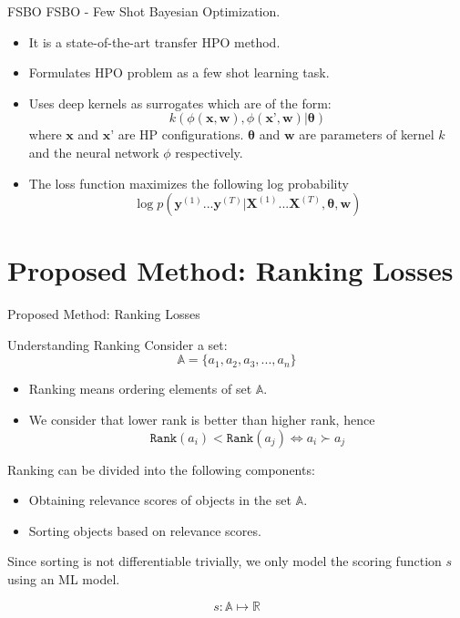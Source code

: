 \documentclass{beamer}
\begin{document}
\begin{frame}[t]{FSBO}
FSBO - Few Shot Bayesian Optimization.
\begin{itemize}
\item It is a state-of-the-art transfer HPO method.
\item Formulates HPO problem as a few shot learning task.
\item Uses deep kernels as surrogates which are of the form:
$$
k(\phi(\textbf{x}, \textbf{w})  ,   \phi(\textbf{x'}, \textbf{w}) |  \mathbf{\theta})
$$
where $\textbf{x}$ and $\textbf{x'}$ are HP configurations. $\mathbf{\theta}$ and $\textbf{w}$ are parameters of kernel $k$ and the neural network $\phi$ respectively.

\item The loss function maximizes the following log probability
$$
\log p( \textbf{y}^{(1)}...\textbf{y}^{(T)} | \textbf{X}^{(1)}...\textbf{X}^{(T)}, \mathbf{\theta}, \textbf{w})
$$

\end{itemize}

\end{frame}

\section{Proposed Method: Ranking Losses}

\begin{frame}
\centering
\LARGE{Proposed Method: Ranking Losses}
\end{frame}

\begin{frame}[t]{Understanding Ranking}
Consider a set:
$$
\mathbb{A} = \{a_1,  a_2,  a_3, ... ,  a_n\}
$$

\begin{itemize}
\item Ranking means ordering elements of set $\mathbb{A}$.
\item We consider that lower rank is better than higher rank,  hence
$$
\texttt{Rank}(a_i) < \texttt{Rank}(a_j) \iff a_i  \succ a_j
$$
\end{itemize}

Ranking can be divided into the following components:
\begin{itemize}
\item Obtaining relevance scores of objects in the set $\mathbb{A}$.
\item Sorting objects based on relevance scores.
\end{itemize}

Since sorting is not differentiable trivially,  we only model the scoring function $s$ using an ML model.

$$
s : \mathbb{A} \mapsto \mathbb{R}
$$

\end{frame}
\end{document}
